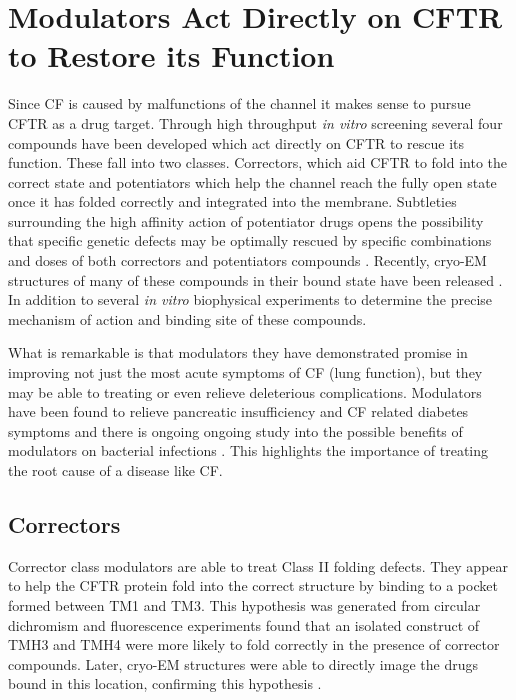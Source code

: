 \section{Modulators Act Directly on CFTR to Restore its Function}
Since CF is caused by malfunctions of the channel it makes sense to pursue CFTR as a drug target. Through high throughput \textit{in vitro} screening several four compounds have been developed which act directly on CFTR to rescue its function. These fall into two classes. Correctors, which aid CFTR to fold into the correct state and potentiators which help the channel reach the fully open state once it has folded correctly and integrated into the membrane. Subtleties surrounding the high affinity action of potentiator drugs opens the possibility that specific genetic defects may be optimally rescued by specific combinations and doses of both correctors and potentiators compounds \cite{csanady2019}. Recently, cryo-EM structures of many of these compounds in their bound state have been released \cite{liu2019, fiedorczuk2022}. In addition to several \textit {in vitro} biophysical experiments to determine the precise mechanism of action and binding site of these compounds.

What is remarkable is that modulators they have demonstrated promise in improving not just the most acute symptoms of CF (lung function), but they may be able to treating or even relieve deleterious complications. Modulators have been found to relieve pancreatic insufficiency and CF related diabetes symptoms \cite{gaines2021,lopes-pacheco2020, yi2021} and there is ongoing ongoing study into the possible benefits of modulators on bacterial infections \cite{harvey2022}. This highlights the importance of treating the root cause of a disease like CF.

\subsection{Correctors}
Corrector class modulators are able to treat Class II folding defects. They appear to help the CFTR protein fold into the correct structure by binding to a pocket formed between TM1 and TM3. This hypothesis was generated from circular dichromism \cite{greenfield2006} and fluorescence experiments found that an isolated construct of TMH3 and TMH4 were more likely to fold correctly in the presence of corrector compounds. Later, cryo-EM structures were able to directly image the drugs bound in this location, confirming this hypothesis \cite{fiedorczuk2022}. 

